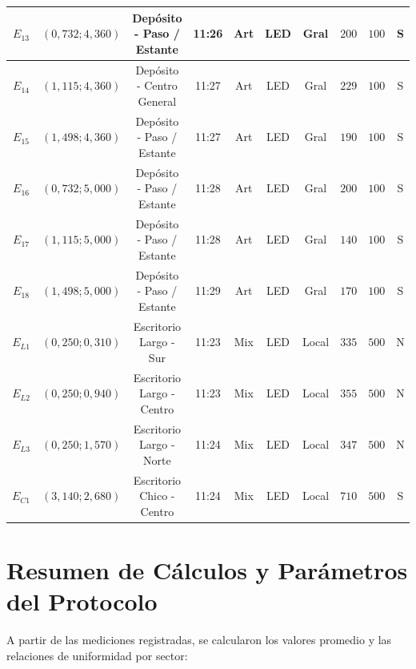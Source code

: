 \begin{table}[!ht]
{\begin{tabular}{|c|c|c|c|c|c|c|c|c|c|}
$E_{13}$ & $(0{,}732; 4{,}360)$ & Depósito - Paso / Estante   & 11:26 & Art & LED & Gral & $200$ & $100$ & S \\ \hline
$E_{14}$ & $(1{,}115; 4{,}360)$ & Depósito - Centro General   & 11:27 & Art & LED & Gral & $229$ & $100$ & S \\ \hline
$E_{15}$ & $(1{,}498; 4{,}360)$ & Depósito - Paso / Estante   & 11:27 & Art & LED & Gral & $190$ & $100$ & S \\ \hline
$E_{16}$ & $(0{,}732; 5{,}000)$ & Depósito - Paso / Estante   & 11:28 & Art & LED & Gral & $200$ & $100$ & S \\ \hline
$E_{17}$ & $(1{,}115; 5{,}000)$ & Depósito - Paso / Estante   & 11:28 & Art & LED & Gral & $140$ & $100$ & S \\ \hline
$E_{18}$ & $(1{,}498; 5{,}000)$ & Depósito - Paso / Estante   & 11:29 & Art & LED & Gral & $170$ & $100$ & S \\ \hline
\hline
$E_{L1}$ & $(0{,}250; 0{,}310)$ & Escritorio Largo - Sur      & 11:23 & Mix & LED & Local & $335$ & $500$ & N \\ \hline
$E_{L2}$ & $(0{,}250; 0{,}940)$ & Escritorio Largo - Centro   & 11:23 & Mix & LED & Local & $355$ & $500$ & N \\ \hline
$E_{L3}$ & $(0{,}250; 1{,}570)$ & Escritorio Largo - Norte    & 11:24 & Mix & LED & Local & $347$ & $500$ & N \\ \hline
\hline
$E_{C1}$ & $(3{,}140; 2{,}680)$ & Escritorio Chico - Centro   & 11:24 & Mix & LED & Local & $710$ & $500$ & S \\ \hline
\end{tabular}
}
\end{table}

\section{Resumen de Cálculos y Parámetros del Protocolo}
\label{sec.tp2:resumen_resultados_calculados}

A partir de las mediciones registradas, se calcularon los valores promedio y las relaciones de uniformidad por sector:

